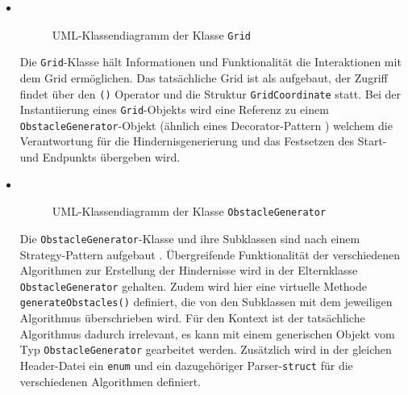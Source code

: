 \begin{itemize}
    \item {} \\
    \begin{figure}[H]
        \vspace{-0.5cm}
        \centering
        
        \caption{UML-Klassendiagramm der Klasse \texttt{Grid}}
        \label{fig:uml_grid}
    \end{figure}
    Die \texttt{Grid}-Klasse hält Informationen und Funktionalität die Interaktionen mit dem Grid ermöglichen.
    Das tatsächliche Grid ist als  aufgebaut, der Zugriff findet über den \texttt{()}
    Operator und die Struktur \texttt{GridCoordinate} statt.
    Bei der Instantiierung eines \texttt{Grid}-Objekts wird eine Referenz zu einem \texttt{ObstacleGenerator}-Objekt (ähnlich eines Decorator-Pattern \cite{nesteruk2021})
    welchem die Verantwortung für die Hindernisgenerierung und das Festsetzen des Start- und Endpunkts übergeben wird.
    \newpage
    \item {} \\
    \begin{figure}[H]
        \vspace{-0.5cm}
        \centering
        
        \caption{UML-Klassendiagramm der Klasse \texttt{ObstacleGenerator}}
        \label{fig:uml_obstacle_gen}
    \end{figure}
    Die \texttt{ObstacleGenerator}-Klasse und ihre Subklassen sind nach einem Strategy-Pattern aufgebaut \cite{nesteruk2021}.
    Übergreifende Funktionalität der verschiedenen Algorithmen zur Erstellung der Hindernisse wird in der Elternklasse \texttt{Obstacle\-Generator} gehalten.
    Zudem wird hier eine virtuelle Methode \texttt{generate\-Obstacles()} definiert, die von den Subklassen mit dem jeweiligen Algorithmus überschrieben wird.
    Für den Kontext ist der tatsächliche Algorithmus dadurch irrelevant, es kann mit einem generischen Objekt vom Typ \texttt{ObstacleGenerator} gearbeitet werden.
    Zusätzlich wird in der gleichen Header-Datei ein \texttt{enum} und ein dazugehöriger Parser-\texttt{struct} für die verschiedenen Algorithmen definiert.
\end{itemize}

